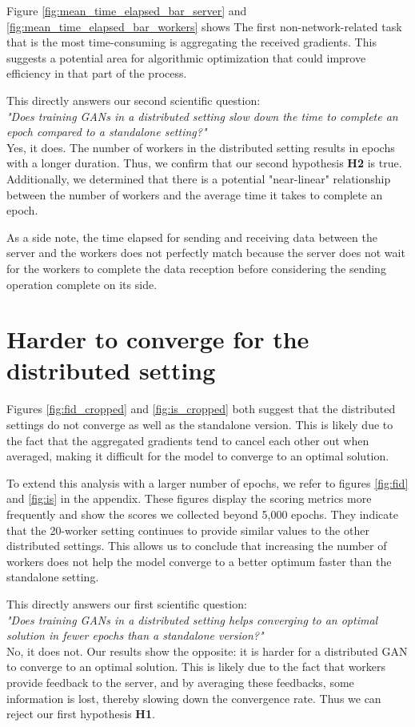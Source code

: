 Figure \ref{fig:mean_time_elapsed_bar_server} and \ref{fig:mean_time_elapsed_bar_workers} shows The first non-network-related task that is the most time-consuming is aggregating the received gradients. This suggests a potential area for algorithmic optimization that could improve efficiency in that part of the process.

This directly answers our second scientific question:\\
\textit{"Does training GANs in a distributed setting slow down the time to complete an epoch compared to a standalone setting?"}\\
Yes, it does. The number of workers in the distributed setting results in epochs with a longer duration. Thus, we confirm that our second hypothesis \textbf{H2} is true. Additionally, we determined that there is a potential "near-linear" relationship between the number of workers and the average time it takes to complete an epoch.

As a side note, the time elapsed for sending and receiving data between the server and the workers does not perfectly match because the server does not wait for the workers to complete the data reception before considering the sending operation complete on its side.

\section{Harder to converge for the distributed setting}
Figures \ref{fig:fid_cropped} and \ref{fig:is_cropped} both suggest that the distributed settings do not converge as well as the standalone version. This is likely due to the fact that the aggregated gradients tend to cancel each other out when averaged, making it difficult for the model to converge to an optimal solution.

To extend this analysis with a larger number of epochs, we refer to figures \ref{fig:fid} and \ref{fig:is} in the appendix. These figures display the scoring metrics more frequently and show the scores we collected beyond 5,000 epochs. They indicate that the 20-worker setting continues to provide similar values to the other distributed settings. This allows us to conclude that increasing the number of workers does not help the model converge to a better optimum faster than the standalone setting.

This directly answers our first scientific question:\\
\textit{"Does training GANs in a distributed setting helps converging to an optimal solution in fewer epochs than a standalone version?"}\\
No, it does not. Our results show the opposite: it is harder for a distributed GAN to converge to an optimal solution. This is likely due to the fact that workers provide feedback to the server, and by averaging these feedbacks, some information is lost, thereby slowing down the convergence rate. Thus we can reject our first hypothesis \textbf{H1}.

